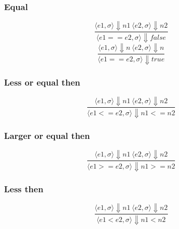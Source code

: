 \documentclass[12pt]{article}
\begin{document}
                \subsubsection{Equal}
                    \begin{equation}  
                        \frac{\langle e1, \sigma \rangle\Downarrow n1 \: \langle e2, \sigma \rangle\Downarrow n2}
                        {\langle e1 == e2, \sigma \rangle\Downarrow false}
                    \end{equation}
                    \begin{equation}  
                        \frac{\langle e1, \sigma \rangle\Downarrow n \: \langle e2, \sigma \rangle\Downarrow n}
                        {\langle e1 == e2, \sigma \rangle\Downarrow true}
                    \end{equation}
                    
                \subsubsection{Less or equal then}
                    \begin{equation}  
                        \frac{\langle e1, \sigma \rangle\Downarrow n1 \: \langle e2, \sigma \rangle\Downarrow n2}
                        {\langle e1 <= e2, \sigma \rangle\Downarrow n1 <= n2}
                    \end{equation}
                    
                \subsubsection{Larger or equal then}
                    \begin{equation}  
                        \frac{\langle e1, \sigma \rangle\Downarrow n1 \: \langle e2, \sigma \rangle\Downarrow n2}
                        {\langle e1 >= e2, \sigma \rangle\Downarrow n1 >= n2}
                    \end{equation}
            
                \subsubsection{Less then}
                    \begin{equation}  
                        \frac{\langle e1, \sigma \rangle\Downarrow n1 \: \langle e2, \sigma \rangle\Downarrow n2}
                        {\langle e1 < e2, \sigma \rangle\Downarrow n1 < n2}
                    \end{equation}
                    
\end{document}
